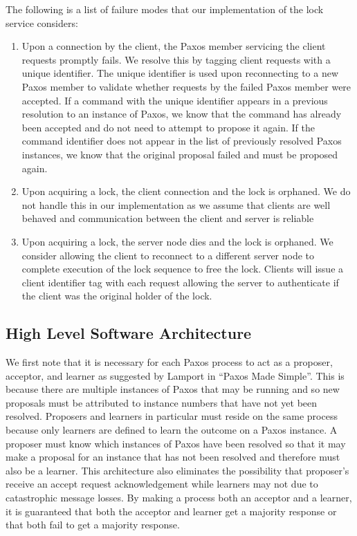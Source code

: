 \documentclass{article}
\begin{document}
The following is a list of failure modes that our implementation of the lock service considers:

\begin{enumerate}
\item Upon a connection by the client, the Paxos member servicing the client requests promptly fails. 
  We resolve this by tagging client requests with a unique identifier.
  The unique identifier is used upon reconnecting to a new Paxos member to validate whether requests by the failed Paxos member were accepted.
  If a command with the unique identifier appears in a previous resolution to an instance of Paxos, we know that the command has already been accepted and do not need to attempt to propose it again.
  If the command identifier does not appear in the list of previously resolved Paxos instances, we know that the original proposal failed and must be proposed again.
\item Upon acquiring a lock, the client connection and the lock is orphaned. 
  We do not handle this in our implementation as we assume that clients are well behaved and communication between the client and server is reliable
\item Upon acquiring a lock, the server node dies and the lock is orphaned.
  We consider allowing the client to reconnect to a different server node to complete execution of the lock sequence to free the lock.
  Clients will issue a client identifier tag with each request allowing the server to authenticate if the client was the original holder of the lock.
\end{enumerate}

\subsection{High Level Software Architecture}

We first note that it is necessary for each Paxos process to act as a proposer, acceptor, and learner as suggested by Lamport in ``Paxos Made Simple''.
This is because there are multiple instances of Paxos that may be running and so new proposals must be attributed to instance numbers that have not yet been resolved.
Proposers and learners in particular must reside on the same process because only learners are defined to learn the outcome on a Paxos instance.
A proposer must know which instances of Paxos have been resolved so that it may make a proposal for an instance that has not been resolved and therefore must also be a learner.
This architecture also eliminates the possibility that proposer's receive an accept request acknowledgement while learners may not due to catastrophic message losses.
By making a process both an acceptor and a learner, it is guaranteed that both the acceptor and learner get a majority response or that both fail to get a majority response.
\end{document}
